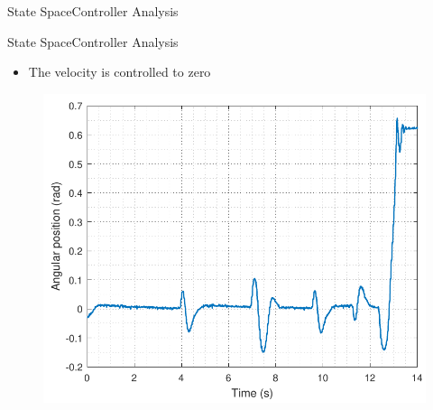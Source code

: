 \begin{frame}{State Space}{Controller Analysis}
\begin{minipage}{\linewidth}
\begin{minipage}{0.45\linewidth}
\begin{figure}[H]
  			\centering
  		\end{figure}
  	\end{minipage}
  \end{minipage}
\end{frame}

\begin{frame}{State Space}{Controller Analysis}
  \begin{itemize}
    \item The velocity is controlled to zero
  \end{itemize}

  \vspace{1cm}
  \hspace{1\linewidth}
  \begin{minipage}{\linewidth}
   	\begin{minipage}{0.45\linewidth}
   		\begin{figure}[H]
   			\includegraphics[scale=.35]{Pictures/positionSSTest}
   			\centering
   		\end{figure}
   	\end{minipage}
   	\hspace{0.03\linewidth}
   	\begin{minipage}{0.45\linewidth}
   		\begin{figure}[H]

\end{figure}
\end{minipage}
\end{minipage}
\end{frame}

